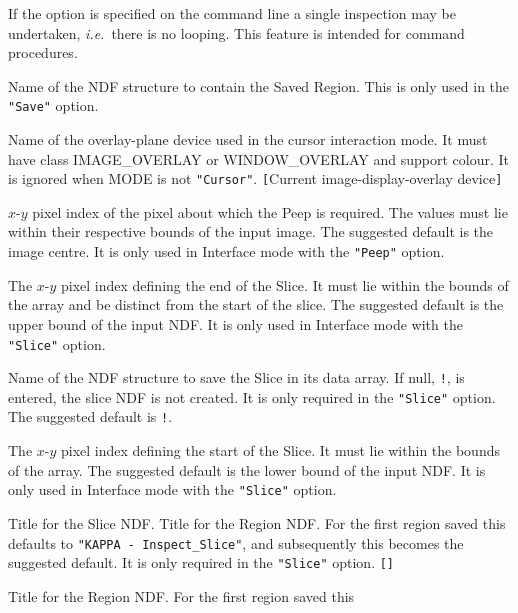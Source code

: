 \documentclass[twoside,11pt]{article}
\newcommand{\sstsubsection}[1]{ \item[{#1}] \mbox{} \\}
\renewcommand{\sstsubsection}[1]{\item[{#1}]}
\begin{document}
{{{         If the option is specified on the command line a single
         inspection may be undertaken, {\it i.e.}\  there is no looping.  This
         feature is intended for command procedures.
      }
      \sstsubsection{
         OUT = NDF (Read)
      }{
         Name of the NDF structure to contain the Saved Region.  This
         is only used in the {\tt "Save"} option.
      }
      \sstsubsection{
         OVERLAY = DEVICE (Read)
      }{
         Name of the overlay-plane device used in the cursor interaction
         mode.  It must have class IMAGE\_OVERLAY or WINDOW\_OVERLAY and
         support colour.  It is ignored when MODE is not {\tt "Cursor"}.
         {\tt [}Current image-display-overlay device{\tt ]}
      }
      \sstsubsection{
         PEIND( 2 ) = \_INTEGER (Read)
      }{
         $x$-$y$ pixel index of the pixel about which the Peep is required.
         The values must lie within their respective bounds of the
         input image.  The suggested default is the image centre.  It
         is only used in Interface mode with the {\tt "Peep"} option.
      }
      \sstsubsection{
         SLEND( 2 ) = \_INTEGER (Read)
      }{
         The $x$-$y$ pixel index defining the end of the Slice.  It
         must lie within the bounds of the array and be distinct from
         the start of the slice.  The suggested default is the upper
         bound of the input NDF.  It is only used in Interface mode
         with the {\tt "Slice"} option.
      }
      \sstsubsection{
         SLICE = NDF (Read)
      }{
         Name of the NDF structure to save the Slice in its data array.
         If null, {\tt !}, is entered, the slice NDF is not created.
         It is only required in the {\tt "Slice"} option.  The
         suggested default is {\tt !}. 
      }
      \sstsubsection{
         SLSTART( 2 ) = \_INTEGER (Read)
      }{
         The $x$-$y$ pixel index defining the start of the Slice.  It must
         lie within the bounds of the array.  The suggested default is
         the lower bound of the input NDF.  It is only used in
         Interface mode with the {\tt "Slice"} option.
      }
      \sstsubsection{
         SLTITLE = LITERAL (Read)
      }{
         Title for the Slice NDF.  Title for the Region NDF.  For the
         first region saved this defaults to {\tt "KAPPA - Inspect\_Slice"},
         and subsequently this becomes the suggested default.  It is
         only required in the {\tt "Slice"} option. {\tt []}
      }
      \sstsubsection{
         TITLE = LITERAL (Read)
      }{
         Title for the Region NDF.  For the first region saved this
}}}
\end{document}
